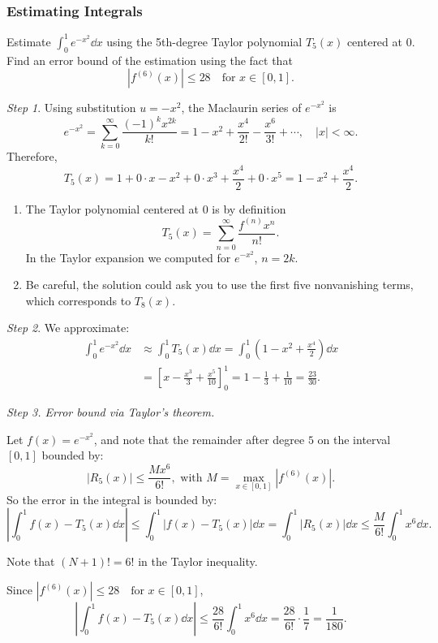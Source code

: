 \subsubsection{Estimating Integrals}
\begin{ex}
Estimate \(\displaystyle \int_0^1 e^{-x^2} \dd x\) using the 5th-degree Taylor polynomial \(T_5(x)\) centered at 0. Find an error bound of the estimation using the fact that
\[|f^{(6)}(x)| \leq 28 \quad \text{for } x \in [0,1].\]


\textit{Step 1}. Using substitution $u = -x^2$, the Maclaurin series of \(e^{-x^2}\) is 
\[
e^{-x^2} = \sum_{k=0}^{\infty} \frac{(-1)^k x^{2k}}{k!} = 1 - x^2 + \frac{x^4}{2!} - \frac{x^6}{3!} + \cdots, \quad |x| < \infty.
\]
Therefore,
\[
T_5(x) = 1 + 0 \cdot x - x^2 + 0 \cdot x^3 + \frac{x^4}{2} + 0 \cdot x^5 =  1 - x^2 + \frac{x^4}{2}.
\]
\begin{rmk}\leavevmode
    \begin{enumerate}
        \item The Taylor polynomial centered at 0 is by definition
        \[T_5(x) = \sum_{n=0}^{\infty} \frac{f^{(n)} x^n}{n!}.\] 
        In the Taylor expansion we computed for $e^{-x^2}$, $n = 2k$. 
        \item Be careful, the solution could ask you to use the first five nonvanishing terms, which corresponds to $T_8(x)$.
    \end{enumerate}
\end{rmk}

\textit{Step 2}. We approximate:
\begin{align*}
    \int_0^1 e^{-x^2} \dd x &\approx \int_0^1 T_5(x) \dd x = \int_0^1 \left(1 - x^2 + \frac{x^4}{2} \right) \dd x\\
    &= \left[x - \frac{x^3}{3} + \frac{x^5}{10} \right]_0^1 = 1 - \frac{1}{3} + \frac{1}{10} = \frac{23}{30}.
\end{align*}

\textit{Step 3. Error bound via Taylor’s theorem.}

Let \(f(x) = e^{-x^2}\), and note that the remainder after degree \(5\) on the interval \([0,1]\) bounded by:
\[|R_5(x)| \leq \frac{M x^6}{6!}, \text{ with } M = \max_{x\in[0,1]} |f^{(6)}(x)|.\]
So the error in the integral is bounded by:
\[\left| \int_0^1 f(x) - T_5(x) \dd x \right| \leq  \int_0^1 |f(x) - T_5(x)| \dd x = \int_0^1 \left| R_5(x) \right| \dd x \leq \frac{M}{6!} \int_0^1  x^6\dd x.\]

\begin{rmk}
    Note that $(N+1)! = 6!$ in the Taylor inequality.
\end{rmk}
Since $|f^{(6)}(x)| \leq 28 \quad \text{for } x \in [0,1]$,
\[
\left| \int_0^1 f(x) - T_5(x) \dd x \right| \leq \frac{28}{6!} \int_0^1 x^6 \dd x = \frac{28}{6!} \cdot \frac{1}{7} = \frac{1}{180}.
\]

\end{ex}

